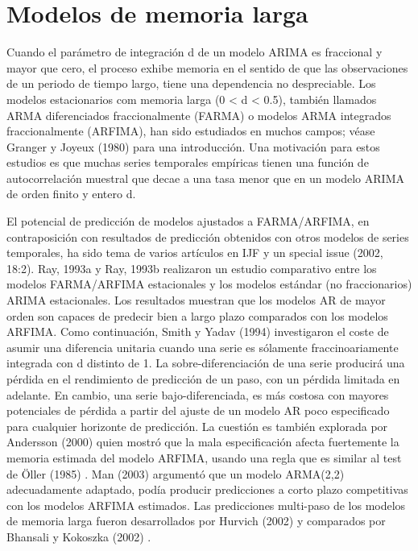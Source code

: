 \documentclass{llncs}
\begin{document}
\section{Modelos de memoria larga}
Cuando el parámetro de integración d de un modelo ARIMA es fraccional y mayor que cero, el proceso exhibe memoria en el sentido de que las observaciones de un periodo de tiempo largo, tiene una dependencia no despreciable. Los modelos estacionarios com memoria larga (0 < d < 0.5), también llamados ARMA diferenciados fraccionalmente (FARMA) o modelos ARMA integrados fraccionalmente (ARFIMA), han sido estudiados en muchos campos; véase Granger y Joyeux (1980) \cite{Granger198015} para una introducción. Una motivación para estos estudios es que muchas series temporales empíricas tienen una función de autocorrelación muestral que decae a una tasa menor que en un modelo ARIMA de orden finito y entero d.

El potencial de predicción de modelos ajustados a FARMA/ARFIMA, en contraposición con resultados de predicción obtenidos con otros modelos de series temporales, ha sido tema de varios artículos en IJF y un special issue (2002, 18:2). Ray, 1993a \cite{Ray1993255} y Ray, 1993b \cite{Ray1993511} realizaron un estudio comparativo entre los modelos FARMA/ARFIMA estacionales y los modelos estándar (no fraccionarios) ARIMA estacionales. Los resultados muestran que los modelos AR de mayor orden son capaces de predecir bien a largo plazo comparados con los modelos ARFIMA. Como continuación, Smith y Yadav (1994) \cite{Smith1994507} investigaron el coste de asumir una diferencia unitaria cuando una serie es sólamente fraccinoariamente integrada con d distinto de 1. La sobre-diferenciación de una serie producirá una pérdida en el rendimiento de predicción de un paso, con un pérdida limitada en adelante. En cambio, una serie bajo-diferenciada, es más costosa con mayores potenciales de pérdida a partir del ajuste de un modelo AR poco especificado para cualquier horizonte de predicción. La cuestión es también explorada por Andersson (2000) \cite{Andersson2000121} quien mostró que la mala especificación afecta fuertemente la memoria estimada del modelo ARFIMA, usando una regla que es similar al test de Öller (1985) \cite{Oller1985135}. Man (2003) \cite{Man2003477} argumentó que un modelo ARMA(2,2) adecuadamente adaptado, podía producir predicciones a corto plazo competitivas con los modelos ARFIMA estimados. Las predicciones multi-paso de los modelos de memoria larga fueron desarrollados por Hurvich (2002) \cite{Hurvich2002167} y comparados por Bhansali y Kokoszka (2002) \cite{Bhansali2002181}.
\end{document}

